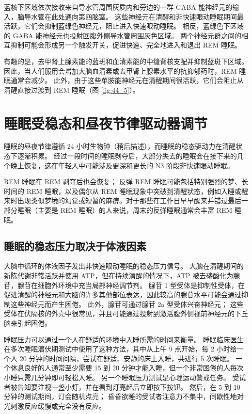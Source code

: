 蓝核下区域依次接收来自导水管周围灰质内和旁边的一群 GABA 能神经元的输入，脑导水管在此处通向第四脑室。
这些神经元在清醒和非快速眼动睡眠期间最活跃，它们会抑制蓝绿色神经元，阻止进入快速眼动睡眠。
相反，蓝绿色下区域的 GABA 能神经元也投射回腹外侧导水管周围灰色区域。
两个神经元群之间的相互抑制可能会形成另一个触发开关，促进快速、完全地进入和退出 REM 睡眠。


有趣的是，去甲肾上腺素能的蓝斑和血清素能的中缝背核支配并抑制蓝斑下区域。
因此，当人们服用会增加大脑血清素或去甲肾上腺素水平的抗抑郁药时，REM 睡眠通常会减少。
此外，由于这些单胺能神经元在清醒期间很活跃，它们会阻止从清醒直接过渡到 REM 睡眠（图 \ref{fig:44_5}）。



\section{睡眠受稳态和昼夜节律驱动器调节}

睡眠的昼夜节律遵循 24 小时生物钟（稍后描述），而睡眠的稳态驱动力在清醒状态下逐渐积累。
经过一段时间的睡眠剥夺后，大部分失去的睡眠会在接下来的几个晚上恢复，这在年轻人中可能涉及更深和更长的 N3 阶段非快速眼动睡眠。


REM 睡眠在 REM 剥夺后也会恢复；
反弹 REM 睡眠可能包括特别强烈的梦、长时间的 REM 睡眠，以及偶尔从 REM 睡眠现象中突破到清醒状态，例如入睡或醒来时出现类似梦境的幻觉或短暂的麻痹。对于那些在工作日早早醒来并错过最后一部分睡眠（主要是 REM 睡眠）的人来说，周末的反弹睡眠通常会丰富 REM 睡眠。



\subsection{睡眠的稳态压力取决于体液因素}

大脑中循环的体液因子发出非快速眼动睡眠的稳态压力信号。
大脑在清醒期间的新陈代谢非常活跃并使用 ATP，但在持续清醒的情况下，ATP 被去磷酸化为腺苷，腺苷在细胞外环境中充当局部神经调节剂。
腺苷 1 型受体是抑制性受体，在促进清醒的神经元和大脑的许多其他部位表达，因此较高的腺苷水平可能会通过抑制这些神经元而产生困倦。
此外，腺苷可通过腺苷 2a 型受体兴奋神经元；
这些受体在伏隔核的外壳中很常见，并且可能通过投射到激活腹外侧视前神经元的下丘脑来引起困倦。


睡眠压力可以通过一个人在舒适的环境中入睡所需的时间来衡量。
睡眠临床医生在多次睡眠潜伏期测试中使用了这种方法，其中从上午 9 点开始，每 2 小时给一个人 20 分钟的时间间隔，尝试在舒适、安静的床上入睡，共进行 5 次睡眠。
一个休息良好的人通常至少需要 15 到 20 分钟才能入睡，但一个非常困倦的人每次小睡只需几分钟即可轻松入睡。
另一个睡眠压力测试是心理运动警戒任务。
受试者被告知要注视一盏小灯，并在看到灯亮起后立即按下按钮。
然后，在 5 到 10 分钟的测试期间，灯会随机点亮；
昏昏欲睡的受试者注意力不集中，间歇性地对光刺激反应缓慢或完全没有反应。



